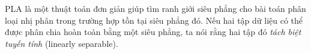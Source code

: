 PLA là một thuật toán đơn giản giúp tìm ranh giới siêu phẳng cho bài toán phân loại nhị phân trong trường hợp tồn tại siêu phẳng đó. Nếu hai tập dữ liệu có thể được phân chia hoàn toàn bằng một siêu phẳng, ta nói rằng hai tập đó \textit{tách biệt tuyến tính} ({linearly separable}).       



